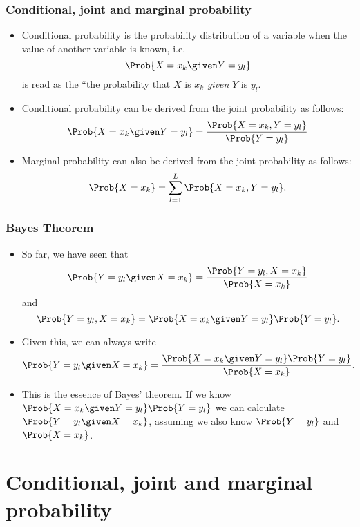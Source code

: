 \documentclass[10pt,xcolor=dvipsnames,serif,professionalfont]{beamer} %
\begin{document}
\begin{frame}
\frametitle{Conditional, joint and marginal probability}
\begin{itemize}
\item Conditional probability is the probability distribution of a variable when the value of another variable is known, i.e. 
\begin{equation}
\Prob{X=x_k \given Y=y_l } 
\end{equation}
is read as the ``the probability that $X$ is $x_k$ \emph{given} $Y$ is $y_l$.
\item Conditional probability can be derived from the joint probability as follows:
\begin{equation}
\Prob{X=x_k \given Y=y_l } = \frac{\Prob{X=x_k, Y=y_l }}{ \Prob{Y=y_l } }
\end{equation}
\item Marginal probability can also be derived from the joint probability as follows:
\begin{equation}
\Prob{X=x_k} = \sum_{l=1}^L \Prob{X=x_k, Y=y_l }.
\end{equation}
\end{itemize}
\end{frame}

\begin{frame}
\frametitle{Bayes Theorem}
\begin{itemize}
\item So far, we have seen that 
\begin{equation}
\Prob{Y=y_l \given X=x_k} = \frac{\Prob{Y=y_l,X=x_k}}{\Prob{X=x_k}}
\end{equation}
and
\begin{equation}
\Prob{Y=y_l,X=x_k} = \Prob{X=x_k\given Y=y_l}\Prob{Y=y_l}.
\end{equation}
\item Given this, we can always write
\begin{equation}
\Prob{Y=y_l \given X=x_k} = \frac{ \Prob{X=x_k\given Y=y_l}\Prob{Y=y_l}  } { \Prob{X=x_k} } .
\end{equation}
\item This is the essence of Bayes' theorem. If we know $\Prob{X=x_k\given Y=y_l}\Prob{Y=y_l}$ we can calculate $\Prob{Y=y_l \given X=x_k}$, assuming we also know $\Prob{Y=y_l}$ and $\Prob{X=x_k}$.
\end{itemize}
\end{frame}



\section{Conditional, joint and marginal probability}
\end{document}
